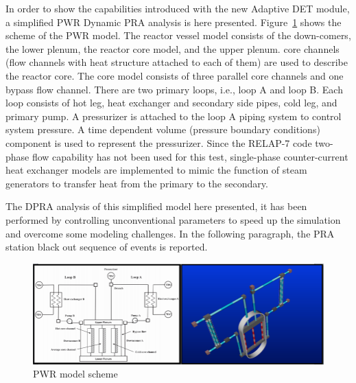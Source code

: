 \label{sec:demo}
In order to show the capabilities introduced with the new Adaptive DET module, a simplified PWR Dynamic PRA analysis is here presented.
Figure~\ref{fig:PWRmodel} shows the scheme of the PWR model. The reactor vessel model consists of the down-comers, the lower plenum, the reactor core model, and the upper plenum. core channels (flow channels with heat structure attached to each of them) are used to describe the reactor core. The core model consists of three parallel core channels and one bypass flow channel. There are two primary loops, i.e., loop A and loop B. Each loop consists of hot leg, heat exchanger and secondary side pipes, cold leg, and primary pump. A pressurizer is attached to the loop A piping system to control system pressure. A time dependent volume (pressure boundary conditions) component is used to represent the pressurizer. Since the RELAP-7 code two-phase flow capability has not been used for this test, single-phase counter-current heat exchanger models are implemented to mimic the function of steam generators to transfer heat from the primary to the secondary.

The DPRA analysis of this simplified model here presented, it has been performed by controlling unconventional parameters to speed up the simulation and overcome some modeling challenges. In the following paragraph, the PRA station black out sequence of events is reported.
\begin{figure}[h]
   \centering
    \includegraphics[width=1.0\textwidth]{figures/PWR_TMI_SCHEME.PNG}
    \caption{PWR model scheme}
    \label{fig:PWRmodel}
\end{figure}
